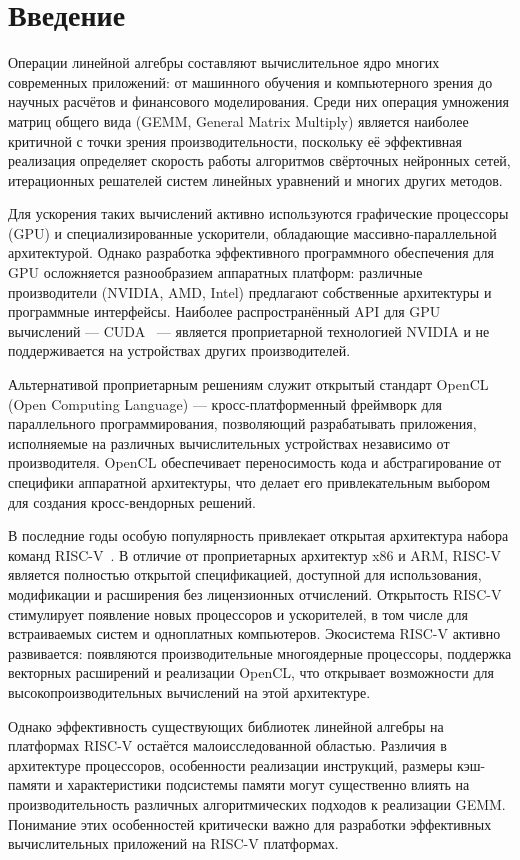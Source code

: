 
\section*{Введение}
\thispagestyle{withCompileDate}

Операции линейной алгебры составляют вычислительное ядро многих современных приложений: от машинного обучения и компьютерного зрения до научных расчётов и финансового моделирования. Среди них операция умножения матриц общего вида (GEMM, General Matrix Multiply) является наиболее критичной с точки зрения производительности, поскольку её эффективная реализация определяет скорость работы алгоритмов свёрточных нейронных сетей, итерационных решателей систем линейных уравнений и многих других методов.

Для ускорения таких вычислений активно используются графические процессоры (GPU) и специализированные ускорители, обладающие массивно-параллельной архитектурой. Однако разработка эффективного программного обеспечения для GPU осложняется разнообразием аппаратных платформ: различные производители (NVIDIA, AMD, Intel) предлагают собственные архитектуры и программные интерфейсы. Наиболее распространённый API для GPU вычислений --- CUDA~\cite{nickolls2008cuda} --- является проприетарной технологией NVIDIA и не поддерживается на устройствах других производителей.

Альтернативой проприетарным решениям служит открытый стандарт OpenCL~\cite{opencl_spec} (Open Computing Language) --- кросс-платформенный фреймворк для параллельного программирования, позволяющий разрабатывать приложения, исполняемые на различных вычислительных устройствах независимо от производителя. OpenCL обеспечивает переносимость кода и абстрагирование от специфики аппаратной архитектуры, что делает его привлекательным выбором для создания кросс-вендорных решений.

В последние годы особую популярность привлекает открытая архитектура набора команд RISC-V~\cite{waterman2014risc}. В отличие от проприетарных архитектур x86 и ARM, RISC-V является полностью открытой спецификацией, доступной для использования, модификации и расширения без лицензионных отчислений. Открытость RISC-V стимулирует появление новых процессоров и ускорителей, в том числе для встраиваемых систем и одноплатных компьютеров. Экосистема RISC-V активно развивается: появляются производительные многоядерные процессоры, поддержка векторных расширений и реализации OpenCL, что открывает возможности для высокопроизводительных вычислений на этой архитектуре.

Однако эффективность существующих библиотек линейной алгебры на платформах RISC-V остаётся малоисследованной областью. Различия в архитектуре процессоров, особенности реализации инструкций, размеры кэш-памяти и характеристики подсистемы памяти могут существенно влиять на производительность различных алгоритмических подходов к реализации GEMM. Понимание этих особенностей критически важно для разработки эффективных вычислительных приложений на RISC-V платформах.
